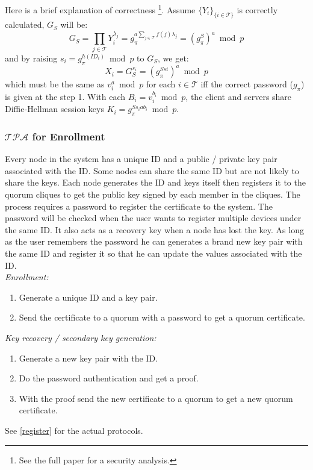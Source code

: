 \ifdefined\ABSTRACT
Here is a brief explanation of correctness
\footnote{See the full paper for a security analysis.}.
Assume $\{Y_i\}_{\{i \in \mathcal{T}\}}$ is correctly calculated,
$G_S$ will be:
\[
  G_S = \prod_{j \in \mathcal{T}}Y_i^{\lambda_j} = g_{\pi}^{a \sum_{j
      \in \mathcal{T}} f(j) \lambda_j} = (g_{\pi}^S)^a \bmod p
\]
and by raising $s_i = g_{\pi}^{h(ID_i)} \bmod p$ to $G_S$, we get:
\[
  X_i = G_S^{s_i} = (g_{\pi}^{Ssi})^a \bmod p
\]
which must be the same as $v_i^a \bmod p$ for each $i \in
\mathcal{T}$ iff the correct password ($g_{\pi}$) is given at the
step 1. With each $B_i = v_i^{b_i} \bmod p$, the client and servers
share Diffie-Hellman session keys $K_i = g_{\pi}^{Ss_iab_i} \bmod p$.
\fi

\subsubsection*{$\mathcal{TPA}$ for Enrollment}
Every node in the system has a unique ID and a public / private key
pair associated with the ID. Some nodes can share the same ID but are
not likely to share the keys. Each node generates the ID and keys
itself then registers it to the quorum cliques to get the public key
signed by each member in the cliques. The process requires a password
to register the certificate to the system. The password will be checked
when the user wants to register multiple devices under the
same ID. It also acts as a recovery key when a node has lost the
key. As long as the user remembers the password he can generates a
brand new key pair with the same ID and register it so that he can
update the values associated with the ID.\\

\noindent
{\em Enrollment:}
\begin{enumerate}
\item Generate a unique ID and a key pair.
\item Send the certificate to a quorum with a password to get a
  quorum certificate.
\end{enumerate}

\noindent
{\em Key recovery / secondary key generation:}
\begin{enumerate}
\item Generate a new key pair with the ID.
\item Do the password authentication and get a proof.
\item With the proof send the new certificate to a quorum to get a new
  quorum certificate.
\end{enumerate}
\ifdefined\ABSTRACT
\else
See \ref{register} for the actual protocols.
\fi


